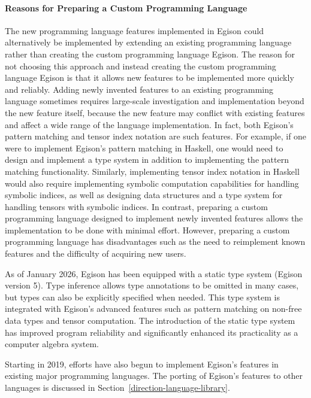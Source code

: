 \begin{framed}
  \paragraph{Reasons for Preparing a Custom Programming Language}
The new programming language features implemented in Egison could alternatively be implemented by extending an existing programming language rather than creating the custom programming language Egison.
The reason for not choosing this approach and instead creating the custom programming language Egison is that it allows new features to be implemented more quickly and reliably.
Adding newly invented features to an existing programming language sometimes requires large-scale investigation and implementation beyond the new feature itself, because the new feature may conflict with existing features and affect a wide range of the language implementation.
In fact, both Egison's pattern matching and tensor index notation are such features.
For example, if one were to implement Egison's pattern matching in Haskell, one would need to design and implement a type system in addition to implementing the pattern matching functionality.
Similarly, implementing tensor index notation in Haskell would also require implementing symbolic computation capabilities for handling symbolic indices, as well as designing data structures and a type system for handling tensors with symbolic indices.
In contrast, preparing a custom programming language designed to implement newly invented features allows the implementation to be done with minimal effort.
However, preparing a custom programming language has disadvantages such as the need to reimplement known features and the difficulty of acquiring new users.

As of January 2026, Egison has been equipped with a static type system (Egison version 5).
Type inference allows type annotations to be omitted in many cases, but types can also be explicitly specified when needed.
This type system is integrated with Egison's advanced features such as pattern matching on non-free data types and tensor computation.
The introduction of the static type system has improved program reliability and significantly enhanced its practicality as a computer algebra system.

Starting in 2019, efforts have also begun to implement Egison's features in existing major programming languages.
The porting of Egison's features to other languages is discussed in Section~\ref{direction-language-library}.
\end{framed}

